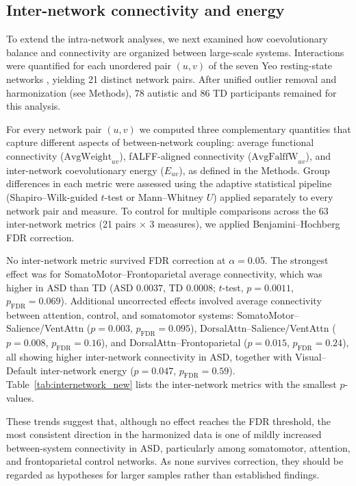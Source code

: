 \documentclass[10pt,letterpaper]{article}
\begin{document}
\subsection*{Inter-network connectivity and energy}

To extend the intra-network analyses, we next examined how coevolutionary balance and connectivity
are organized between large-scale systems. Interactions were quantified for each unordered pair
$(u,v)$ of the seven Yeo resting-state networks \cite{Yeo2011}, yielding 21 distinct network pairs.
After unified outlier removal and harmonization (see Methods), 78 autistic
and 86 TD participants remained for this analysis.

For every network pair $(u,v)$ we computed three complementary quantities that capture different
aspects of between-network coupling: average functional connectivity ($\mathrm{AvgWeight}_{uv}$),
fALFF-aligned connectivity ($\mathrm{AvgFalffW}_{uv}$), and inter-network coevolutionary energy
($E_{uv}$), as defined in the Methods. Group differences in each metric were assessed using the
adaptive statistical pipeline (Shapiro--Wilk-guided $t$-test or Mann--Whitney $U$) applied
separately to every network pair and measure. To control for multiple comparisons across the 63
inter-network metrics (21 pairs $\times$ 3 measures), we applied Benjamini--Hochberg FDR correction.

No inter-network metric survived FDR correction at $\alpha = 0.05$. The strongest effect was for
SomatoMotor--Frontoparietal average connectivity, which was higher in ASD than TD (ASD $0.0037$, TD
$0.0008$; $t$-test, $p = 0.0011$, $p_{\mathrm{FDR}} = 0.069$). Additional uncorrected effects
involved average connectivity between attention, control, and somatomotor systems: SomatoMotor--
Salience/VentAttn ($p = 0.003$, $p_{\mathrm{FDR}} = 0.095$), DorsalAttn--Salience/VentAttn
($p = 0.008$, $p_{\mathrm{FDR}} = 0.16$), and DorsalAttn--Frontoparietal ($p = 0.015$,
$p_{\mathrm{FDR}} = 0.24$), all showing higher inter-network connectivity in ASD, together with
Visual--Default inter-network energy ($p = 0.047$, $p_{\mathrm{FDR}} = 0.59$).
Table~\ref{tab:internetwork_new} lists the inter-network metrics with the smallest $p$-values.

These trends suggest that, although no effect reaches the FDR threshold, the most consistent
direction in the harmonized data is one of mildly increased between-system connectivity in ASD,
particularly among somatomotor, attention, and frontoparietal control networks. As none survives
correction, they should be regarded as hypotheses for larger samples rather than established
findings.
\end{document}
